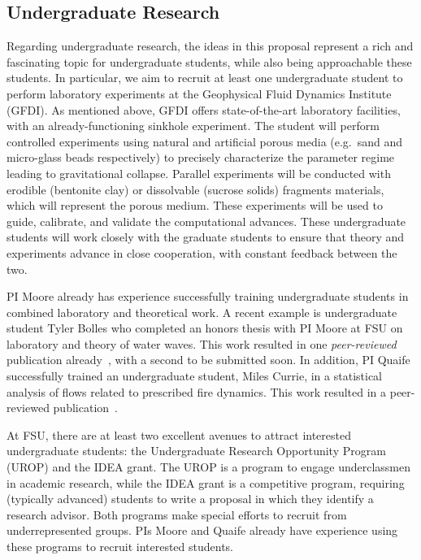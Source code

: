 \documentclass[11pt]{article}
\begin{document}
\subsection{Undergraduate Research}
Regarding undergraduate research, the ideas in this proposal represent a rich and fascinating topic for undergraduate students, while also being approachable these students. In particular, we aim to recruit at least one undergraduate student to perform laboratory experiments at the Geophysical Fluid Dynamics Institute (GFDI). As mentioned above, GFDI offers state-of-the-art laboratory facilities, with an already-functioning sinkhole experiment. The student will perform controlled experiments using natural and artificial porous media (e.g.~sand and micro-glass beads respectively) to precisely characterize the parameter regime leading to gravitational collapse. Parallel experiments will be conducted with erodible (bentonite clay) or dissolvable  (sucrose solids) fragments materials, which will represent the porous medium. These experiments will be used to guide, calibrate, and validate the computational advances. These undergraduate students will work closely with the graduate students to ensure that theory and experiments advance in close cooperation, with constant feedback between the two.

PI Moore already has experience successfully training undergraduate students in combined laboratory and theoretical work. A recent example is undergraduate student Tyler Bolles who completed an honors thesis with PI Moore at FSU on laboratory and theory of water waves. This work resulted in one {\em peer-reviewed} publication already~\cite{Bolles2019}, with a second to be submitted soon. In addition, PI Quaife successfully trained an undergraduate student, Miles Currie, in a statistical analysis of flows related to prescribed fire dynamics.  This work resulted in a peer-reviewed publication~\cite{cur-spe-hie-obr-goo-qua2018}.

At FSU, there are at least two excellent avenues to attract interested undergraduate students:  the Undergraduate Research Opportunity Program (UROP) and the IDEA grant. The UROP is a program to engage underclassmen in academic research, while the IDEA grant is a competitive program, requiring (typically advanced) students to write a proposal in which they identify a research advisor. Both programs make special efforts to recruit from underrepresented groups. PIs Moore and Quaife already have experience using these programs to recruit interested students.
\end{document}
